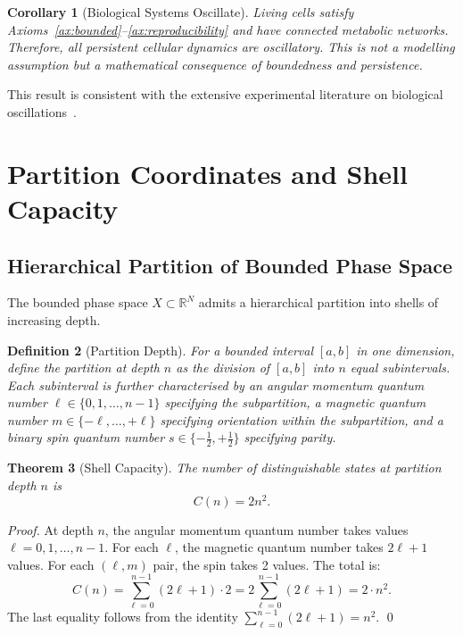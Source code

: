 \documentclass[11pt,twocolumn,a4paper]{article}
\newtheorem{theorem}{Theorem}[section]
\newtheorem{corollary}[theorem]{Corollary}
\newtheorem{definition}[theorem]{Definition}
\newcommand{\R}{\mathbb{R}}
\begin{document}
\begin{corollary}[Biological Systems Oscillate]
Living cells satisfy Axioms~\ref{ax:bounded}--\ref{ax:reproducibility}
and have connected metabolic networks.  Therefore, all persistent
cellular dynamics are oscillatory.  This is not a modelling assumption
but a mathematical consequence of boundedness and persistence.
\end{corollary}

This result is consistent with the extensive experimental literature
on biological oscillations~\citep{goldbeter1996,novak2008,winfree1967,
tyson2003}.


\section{Partition Coordinates and Shell Capacity}
\label{sec:partition-coordinates}

\subsection{Hierarchical Partition of Bounded Phase Space}

The bounded phase space $X \subset \R^N$ admits a hierarchical
partition into shells of increasing depth.

\begin{definition}[Partition Depth]
\label{def:partition-depth}
For a bounded interval $[a, b]$ in one dimension, define the
\emph{partition at depth $n$} as the division of $[a, b]$ into $n$
equal subintervals.  Each subinterval is further characterised by an
angular momentum quantum number $\ell \in \{0, 1, \ldots, n-1\}$
specifying the subpartition, a magnetic quantum number
$m \in \{-\ell, \ldots, +\ell\}$ specifying orientation within the
subpartition, and a binary spin quantum number $s \in \{-\tfrac{1}{2},
+\tfrac{1}{2}\}$ specifying parity.
\end{definition}

\begin{theorem}[Shell Capacity]
\label{thm:shell-capacity}
The number of distinguishable states at partition depth $n$ is
\begin{equation}
  C(n) = 2n^2.
  \label{eq:shell-capacity}
\end{equation}
\end{theorem}

\begin{proof}
At depth $n$, the angular momentum quantum number takes values
$\ell = 0, 1, \ldots, n-1$.  For each $\ell$, the magnetic quantum
number takes $2\ell + 1$ values.  For each $(\ell, m)$ pair, the spin
takes 2 values.  The total is:
\begin{equation}
  C(n) = \sum_{\ell=0}^{n-1} (2\ell + 1) \cdot 2
       = 2 \sum_{\ell=0}^{n-1} (2\ell + 1)
       = 2 \cdot n^2.
  \label{eq:shell-capacity-proof}
\end{equation}
The last equality follows from the identity
$\sum_{\ell=0}^{n-1}(2\ell+1) = n^2$.  \qed
\end{proof}
\end{document}
